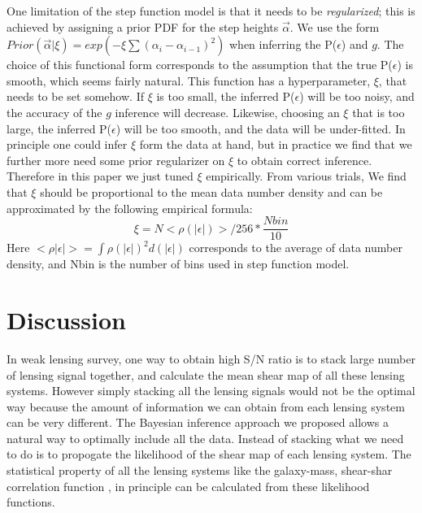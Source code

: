 \documentclass[useAMS,usenatbib]{mn2e}
\begin{document}
One limitation of the step function model is that it needs to be \textit{regularized};
this is achieved by assigning a prior PDF for the step heights $\vec{\alpha}$.
We use the form $Prior(\vec{\alpha}|\xi)=exp(-\xi\sum(\alpha_{i}-\alpha_{i-1})^{2})$
when inferring the P($\epsilon$) and $g$. The choice of this functional
form corresponds to the assumption that the true P($\epsilon$) is
smooth, which seems fairly natural. This function has a hyperparameter,
$\xi$, that needs to be set somehow. If $\xi$ is too small, the
inferred P($\epsilon$) will be too noisy, and the accuracy of the
$g$ inference will decrease. Likewise, choosing an $\xi$ that is
too large, the inferred P($\epsilon$) will be too smooth, and the
data will be under-fitted. In principle one could infer $\xi$ form
the data at hand, but in practice we find that we further more need some
prior regularizer on $\xi$ to obtain correct inference. Therefore in this paper 
we just tuned $\xi$ empirically. From various trials, We find
that $\xi$ should be proportional to the mean data number density and can
be approximated by the following empirical formula: 
\begin{equation}
\xi=N<\rho(|\epsilon|)>/256*\frac{Nbin}{10}
\end{equation}
Here $<\rho|\epsilon|>=\int\rho(|\epsilon|)^{2}d(|\epsilon|)$ corresponds
to the average of data number density, and Nbin is the number of bins used 
in step function model. 




\section{Discussion}

\label{sec:XXX} In weak lensing survey, one way to obtain high S/N
ratio is to stack large number of lensing signal together, and calculate
the mean shear map of all these lensing systems. However simply 
stacking all the lensing signals would not be the optimal way because
the amount of information we can obtain from each lensing system
can be very different. The Bayesian inference approach we proposed
allows a natural way to optimally include all the data. Instead of
stacking what we need to do is to propogate the likelihood of the
shear map of each lensing system. The statistical property of all
the lensing systems like the galaxy-mass, shear-shar correlation function
, in principle can be calculated from these likelihood functions.
\end{document}
